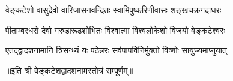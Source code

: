 

\twolineshloka
{वेङ्कटेशो वासुदेवो वारिजासनवन्दितः}
{स्वामिपुष्करिणीवासः शङ्खचक्रगदाधरः}

\twolineshloka
{पीताम्बरधरो देवो गरुडारूढशोभितः}
{विश्वात्मा विश्वलोकेशो विजयो वेङ्कटेश्वरः}

\twolineshloka
{एतद्द्वादशनामानि त्रिसन्ध्यं यः पठेन्नरः}
{सर्वपापविनिर्मुक्तो विष्णोः सायुज्यमाप्नुयात्}

॥इति श्री वेङ्कटेशद्वादशनामस्तोत्रं सम्पूर्णम्॥

